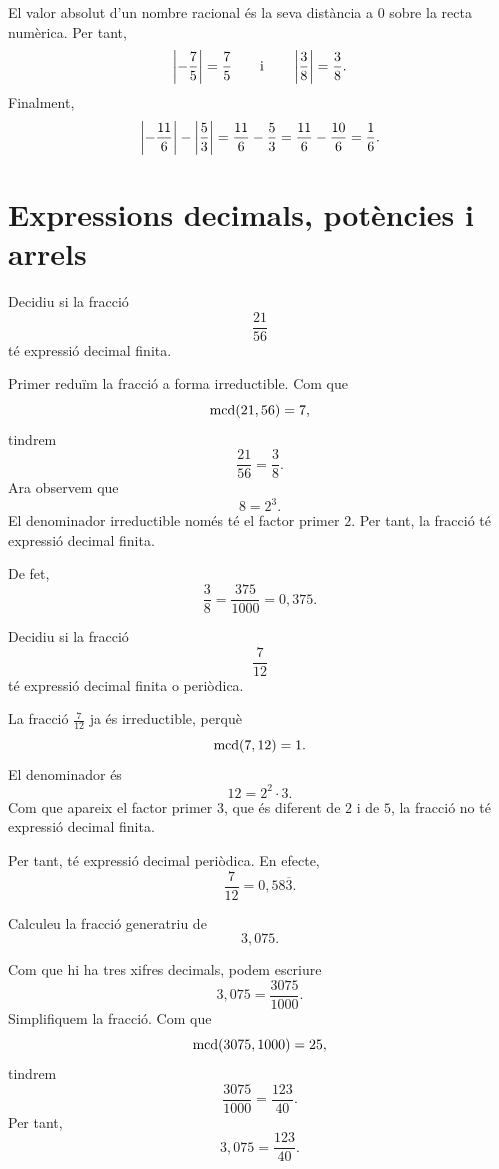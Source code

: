 \begin{solucio}
	El valor absolut d'un nombre racional és la seva distància a \(0\) sobre la recta numèrica. Per tant,
	\[
		\left\lvert -\frac{7}{5}\right\rvert=\frac{7}{5}
		\qquad\text{i}\qquad
		\left\lvert \frac{3}{8}\right\rvert=\frac{3}{8}.
	\]
	Finalment,
	\[
		\left\lvert -\frac{11}{6}\right\rvert-\left\lvert \frac{5}{3}\right\rvert
		=
		\frac{11}{6}-\frac{5}{3}
		=
		\frac{11}{6}-\frac{10}{6}
		=
		\frac{1}{6}.
	\]
\end{solucio}

\section{Expressions decimals, potències i arrels}

\begin{exercici}
	Decidiu si la fracció
	\[
		\frac{21}{56}
	\]
	té expressió decimal finita.
\end{exercici}

\begin{solucio}
	Primer reduïm la fracció a forma irreductible. Com que
	\[
		\operatorname{mcd}(21,56)=7,
	\]
	tindrem
	\[
		\frac{21}{56}
		=
		\frac{3}{8}.
	\]
	Ara observem que
	\[
		8=2^3.
	\]
	El denominador irreductible només té el factor primer \(2\). Per tant, la fracció té expressió decimal finita.

	De fet,
	\[
		\frac{3}{8}
		=
		\frac{375}{1000}
		=
		0{,}375.
	\]
\end{solucio}

\begin{exercici}
	Decidiu si la fracció
	\[
		\frac{7}{12}
	\]
	té expressió decimal finita o periòdica.
\end{exercici}

\begin{solucio}
	La fracció \(\frac{7}{12}\) ja és irreductible, perquè
	\[
		\operatorname{mcd}(7,12)=1.
	\]
	El denominador és
	\[
		12=2^2\cdot3.
	\]
	Com que apareix el factor primer \(3\), que és diferent de \(2\) i de \(5\), la fracció no té expressió decimal finita.

	Per tant, té expressió decimal periòdica. En efecte,
	\[
		\frac{7}{12}=0{,}58\overline{3}.
	\]
\end{solucio}

\begin{exercici}
	Calculeu la fracció generatriu de
	\[
		3{,}075.
	\]
\end{exercici}

\begin{solucio}
	Com que hi ha tres xifres decimals, podem escriure
	\[
		3{,}075=\frac{3075}{1000}.
	\]
	Simplifiquem la fracció. Com que
	\[
		\operatorname{mcd}(3075,1000)=25,
	\]
	tindrem
	\[
		\frac{3075}{1000}
		=
		\frac{123}{40}.
	\]
	Per tant,
	\[
		3{,}075=\frac{123}{40}.
	\]
\end{solucio}

